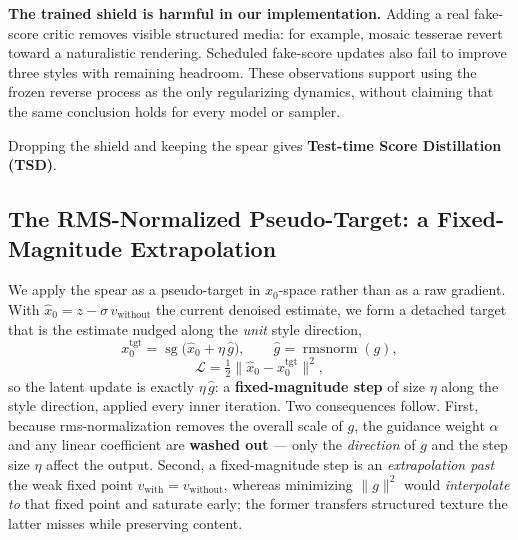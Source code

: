 \documentclass[letterpaper]{article} %
\newcommand{\sg}{\operatorname{sg}}
\newcommand{\rmsnorm}{\operatorname{rmsnorm}}
\begin{document}
\textbf{The trained shield is harmful in our implementation.} Adding a real
fake-score critic removes visible structured media: for example, mosaic
tesserae revert toward a naturalistic rendering. Scheduled fake-score updates
also fail to improve three styles with remaining headroom. These observations
support using the frozen reverse process as the only regularizing dynamics,
without claiming that the same conclusion holds for every model or sampler.

Dropping the shield and keeping the spear gives \textbf{Test-time Score
Distillation (TSD)}.

\subsection{The RMS-Normalized Pseudo-Target: a Fixed-Magnitude
Extrapolation}

We apply the spear as a pseudo-target in $x_0$-space rather than as a raw
gradient. With $\hat x_0 = z - \sigma\,v_{\text{without}}$ the current
denoised estimate, we form a detached target that is the estimate nudged
along the \emph{unit} style direction,
\begin{equation}
x_0^{\text{tgt}} = \sg\!\big(\hat x_0 + \eta\,\widehat{g}\big), \qquad
\widehat{g}=\rmsnorm(g),
\label{eq:pseudotarget}
\end{equation}
\begin{equation}
\mathcal L = \tfrac12\big\lVert \hat x_0 - x_0^{\text{tgt}}\big\rVert^2,
\label{eq:pseudotargetloss}
\end{equation}
so the latent update is exactly $\eta\,\widehat{g}$: a \textbf{fixed-magnitude
step} of size $\eta$ along the style direction, applied every inner
iteration. Two consequences follow. First, because rms-normalization removes
the overall scale of $g$, the guidance weight $\alpha$ and any linear
coefficient are \textbf{washed out} --- only the \emph{direction} of $g$ and
the step size $\eta$ affect the output. Second, a fixed-magnitude step is an
\emph{extrapolation past} the weak fixed point $v_{\text{with}}=v_{\text{without}}$,
whereas minimizing $\lVert g\rVert^2$ would \emph{interpolate to} that fixed
point and saturate early; the former transfers structured texture the latter
misses while preserving content.
\end{document}
